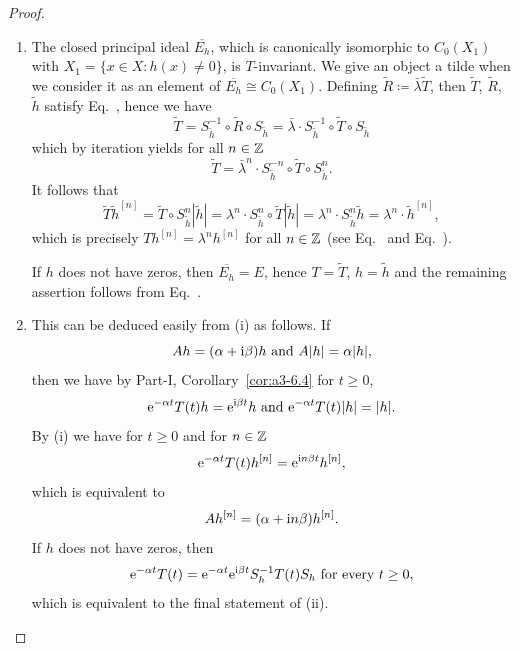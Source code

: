 \begin{proof}
\begin{enumerate}	
\item
The closed principal ideal $\overline{E_{h}}$, which is canonically isomorphic to $C_{0}(X_{1})$ with $X_{1} = \{x \in X \colon h(x) \neq 0\}$, is $T$-invariant.
	We give an object a tilde when we consider it as an element of\/ $\overline{E_{h}} \cong C_{0}(X_{1})$.
	Defining $\tilde{R} \coloneq \bar{\lambda}\tilde{T}$, then $\tilde{T}$, $\tilde{R}$, $\tilde{h}$ satisfy Eq.~, hence we have
	\begin{equation}\label{eq:b3-2.12}
		\tilde{T} = S_{\tilde{h}}^{-1} \circ \tilde{R} \circ S_{\tilde{h}} = \bar{\lambda} \cdot S_{\tilde{h}}^{-1} \circ \tilde{T} \circ S_{\tilde{h}}
	\end{equation}
	which by iteration yields for all $ n \in \mathbb{Z} $
	\begin{equation}\label{eq:b3-2.13}
		\tilde{T} = \bar{\lambda}^{n} \cdot S_{\tilde{h}}^{-n} \circ \tilde{T} \circ S_{\tilde{h}}^{n} .
	\end{equation}
	It follows that
		\begin{equation*}
		\tilde{T}\tilde{h}^{[n]} = \tilde{T} \circ S_{\tilde{h}}^{n}|\tilde{h}| = \lambda^{n} \cdot S_{\tilde{h}}^{n} \circ \tilde{T}|\tilde{h}| 
		= \lambda^{n} \cdot S_{\tilde{h}}^{n}\tilde{h} = \lambda^{n} \cdot \tilde{h}^{[n]} , 
	\end{equation*}
	which is precisely $Th^{[n]} = \lambda^{n}h^{[n]}$ for all $n \in \mathbb{Z}$ (see Eq.~ and Eq.~). 
	
	If\/ $h$ does not have zeros, then $\overline{E_{h}} = E$, hence $T = \tilde{T}$, $h = \tilde{h}$ and the remaining assertion follows from Eq.~.

\item 
    This can be deduced easily from (i) as follows. If
    \[
    Ah = (\alpha+\mathrm{i}\beta )h \text{ and } A|h| = \alpha|h| , 
    \] 
    then we have by Part-I, Corollary~\ref{cor:a3-6.4}  for $ t \geq 0$,
	\[
	\mathrm{e}^{-\alpha t}T(t)h = \mathrm{e}^{\mathrm{i}\beta  t} h \text{ and } \mathrm{e}^{-\alpha t}T(t)|h| = |h| .
	\]
	By (i) we have for $t \geq 0 $ and for $n \in \mathbb{Z}$ 
    \[\mathrm{e}^{-\alpha t}T(t)h^{[n]} = \mathrm{e}^{\mathrm{i} n\beta t}h^{[n]} ,  
    \] 
    which is equivalent to 
    \[ 
    Ah^{[n]} = (\alpha+\mathrm{i} n\beta)h^{[n]} .
    \] 
	If\/ $h$ does not have zeros, then 
    \[
    \eu^{-\alpha t}T(t) = \eu^{-\alpha t}\eu^{\im\beta  t}S_{h}^{-1}T(t)S_{h} \text{ for every } t \geq 0 , 
    \] 
    which is equivalent to the final statement of (ii).
    \end{enumerate}
\end{proof}
